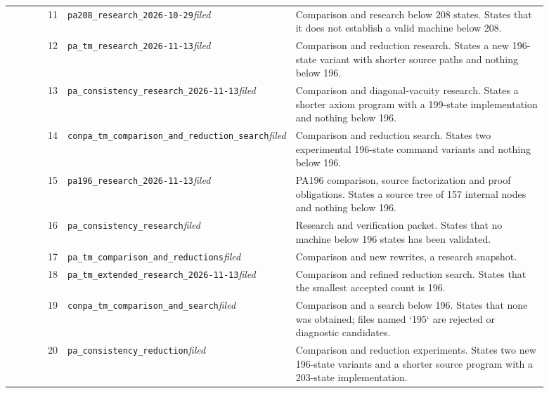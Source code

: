 \begin{longtable}{@{}rp{0.42\linewidth}p{0.47\linewidth}@{}}
11 & \nolinkurl{pa208_research_2026-10-29}\newline\emph{filed} & Comparison and research below 208 states. States that it does not establish a valid machine below 208. \\[2pt]
12 & \nolinkurl{pa_tm_research_2026-11-13}\newline\emph{filed} & Comparison and reduction research. States a new 196-state variant with shorter source paths and nothing below 196. \\[2pt]
13 & \nolinkurl{pa_consistency_research_2026-11-13}\newline\emph{filed} & Comparison and diagonal-vacuity research. States a shorter axiom program with a 199-state implementation and nothing below 196. \\[2pt]
14 & \nolinkurl{conpa_tm_comparison_and_reduction_search}\newline\emph{filed} & Comparison and reduction search. States two experimental 196-state command variants and nothing below 196. \\[2pt]
15 & \nolinkurl{pa196_research_2026-11-13}\newline\emph{filed} & PA196 comparison, source factorization and proof obligations. States a source tree of 157 internal nodes and nothing below 196. \\[2pt]
16 & \nolinkurl{pa_consistency_research}\newline\emph{filed} & Research and verification packet. States that no machine below 196 states has been validated. \\[2pt]
17 & \nolinkurl{pa_tm_comparison_and_reductions}\newline\emph{filed} & Comparison and new rewrites, a research snapshot. \\[2pt]
18 & \nolinkurl{pa_tm_extended_research_2026-11-13}\newline\emph{filed} & Comparison and refined reduction search. States that the smallest accepted count is 196. \\[2pt]
19 & \nolinkurl{conpa_tm_comparison_and_search}\newline\emph{filed} & Comparison and a search below 196. States that none was obtained; files named `195` are rejected or diagnostic candidates. \\[2pt]
20 & \nolinkurl{pa_consistency_reduction}\newline\emph{filed} & Comparison and reduction experiments. States two new 196-state variants and a shorter source program with a 203-state implementation. \\[2pt]

\end{longtable}
